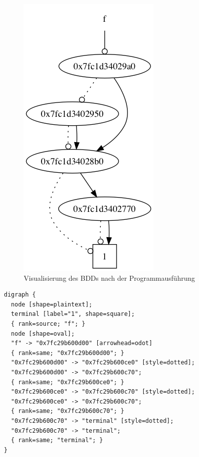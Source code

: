 \begin{figure}[bth]
	\centering
	\includegraphics[scale=0.6]{./appendix/img/f}
	\caption[Visualisierung des BDDs nach der Programmausführung]{Visualisierung des BDDs nach der Programmausführung}
	\label{fig:vis}
\end{figure}
\noindent
\begin{verbatim}
digraph {
  node [shape=plaintext];
  terminal [label="1", shape=square];
  { rank=source; "f"; }
  node [shape=oval];
  "f" -> "0x7fc29b600d00" [arrowhead=odot]
  { rank=same; "0x7fc29b600d00"; }
  "0x7fc29b600d00" -> "0x7fc29b600ce0" [style=dotted];
  "0x7fc29b600d00" -> "0x7fc29b600c70";
  { rank=same; "0x7fc29b600ce0"; }
  "0x7fc29b600ce0" -> "0x7fc29b600c70" [style=dotted];
  "0x7fc29b600ce0" -> "0x7fc29b600c70";
  { rank=same; "0x7fc29b600c70"; }
  "0x7fc29b600c70" -> "terminal" [style=dotted];
  "0x7fc29b600c70" -> "terminal";
  { rank=same; "terminal"; }
}
\end{verbatim}
